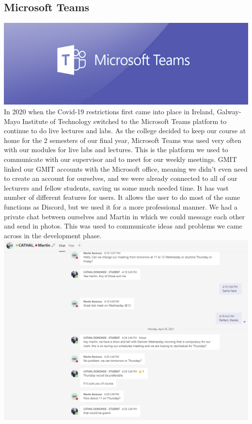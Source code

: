 \subsection{Microsoft Teams}
\includegraphics[scale=0.5]{img/teams-728.jpg}\newline
In 2020 when the Covid-19 restrictions first came into place in Ireland, Galway-Mayo Institute of Technology switched to the Microsoft Teams platform to continue to do live lectures and labs. As the college decided to keep our course at home for the 2 semesters of our final year, Microsoft Teams was used very often with our modules for live labs and lectures. \newline
This is the platform we used to communicate with our supervisor and to meet for our weekly meetings. GMIT linked our GMIT accounts with the Microsoft office, meaning we didn't even need to create an account for ourselves, and we were already connected to all of our lecturers and fellow students, saving us some much needed time. It has vast number of different features for users. It allows the user to do most of the same functions as Discord, but we used it for a more professional manner. We had a private chat between ourselves and Martin in which we could message each other and send in photos. This was used to communicate ideas and problems we came across in the development phase. \newline
\includegraphics[scale=0.4]{img/teams.PNG}\newline
